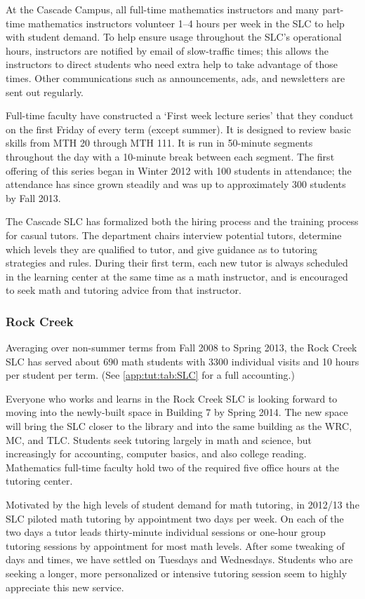 At the Cascade Campus, all full-time mathematics instructors and many part-time
mathematics instructors volunteer 1--4 hours per week in the SLC to help with
student demand. To help ensure usage throughout the SLC's operational hours,
instructors are notified by email of slow-traffic times; this allows the
instructors to direct students who need extra help to take advantage of those
times. Other communications such as announcements, ads, and newsletters are
sent out regularly.

Full-time faculty have constructed a `First week lecture series' that they
conduct on the first Friday of every term (except summer). It is designed to
review basic skills from MTH 20 through MTH 111. It is run in 50-minute
segments throughout the day with a 10-minute break between each segment. The
first offering of this series began in Winter 2012 with 100 students in
attendance; the attendance has since  grown steadily and  was up to
approximately 300 students by Fall 2013. 

The Cascade SLC has formalized both the hiring process and the training process
for casual tutors. The department chairs interview potential tutors, determine 
which levels they are qualified to tutor, and give guidance as to tutoring 
strategies and rules. During their first term, each new tutor is always scheduled in the learning center at the same time as a math instructor, and is encouraged to seek math 
and tutoring advice from that instructor.

\subsubsection{Rock Creek}
Averaging over non-summer terms from Fall 2008 to Spring 2013, the Rock Creek SLC has served about 
690 math students with 3300 individual visits and 10 hours per student per term. (See \vref{app:tut:tab:SLC} for a full accounting.) 

Everyone who works and learns in the Rock Creek SLC is looking forward to
moving into the newly-built space in Building 7 by Spring 2014. The new space
will bring the SLC closer to the library and into the same building as the WRC,
MC, and TLC.  Students seek tutoring largely in math and science, but
increasingly for accounting, computer basics, and also college reading.
Mathematics full-time faculty hold two of the required five office hours at the
tutoring center.

Motivated by the high levels of student demand for math tutoring, in 2012/13
the SLC piloted math tutoring by appointment two days per week. On each of the
two days a tutor leads thirty-minute individual sessions or one-hour group
tutoring sessions by appointment for most math levels.  After some tweaking of
days and times, we have settled on Tuesdays and Wednesdays.  Students who are
seeking a longer, more personalized or intensive tutoring session seem to
highly appreciate this new service.  

